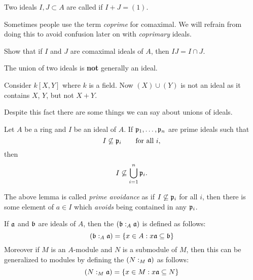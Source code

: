 \documentclass{ximera}
\begin{document}
\begin{definition} Two ideals $I,J \subset A$ are called  if $I+ J = (1)$.
\end{definition}

\begin{remark} Sometimes people use the term \textit{coprime} for comaximal. We will refrain from doing this to avoid confusion later on with \textit{coprimary} ideals.
\end{remark}

\begin{exercise} Show that if $I$ and $J$ are comaximal ideals of $A$, then $IJ = I \cap J$.
\end{exercise}

\begin{warning} The union of two ideals is \textbf{not} generally an ideal. 
\end{warning}

\begin{example} Consider $k[X,Y]$ where $k$ is a field. Now $(X) \cup (Y)$ is not an ideal as it contains $X$, $Y$, but not $X+Y$.
\end{example}

Despite this fact there are some things we can say about unions of ideals.

\begin{lemma}\label{L:PA}
Let $A$ be a ring and $I$ be an ideal of $A$.  If $\mathfrak{p}_1,\ldots,\mathfrak{p}_n$ are prime ideals such that 
\[
I \not\subseteq \mathfrak{p}_i \qquad\text{for all $i$,}
\]
then 
\[
I \not\subseteq \bigcup_{i = 1}^n \mathfrak{p}_i.
\]
\end{lemma}


\begin{remark} The above lemma is called \textit{prime avoidance} as if $I\not\subseteq \mathfrak{p}_i$ for all $i$, then there is some element of $a \in I$ which \textit{avoids} being contained in any $\mathfrak{p}_i$. 
\end{remark}


\begin{definition} If $\mathfrak{a}$ and $\mathfrak{b}$ are ideals of $A$, then the  $(\mathfrak{b}:_A \mathfrak{a})$ is defined as follows:
\[
(\mathfrak{b}:_A \mathfrak{a}) = \{ x\in A: x\mathfrak{a} \subseteq \mathfrak{b}\}
\]
Moreover if $M$ is an $A$-module and $N$ is a submodule of $M$, then this can be generalized to modules by defining the  $(N:_M \mathfrak{a})$ as follows:
\[
(N:_M \mathfrak{a}) = \{x\in M: x\mathfrak{a} \subseteq N  \}
\]
\end{definition}
\end{document}
